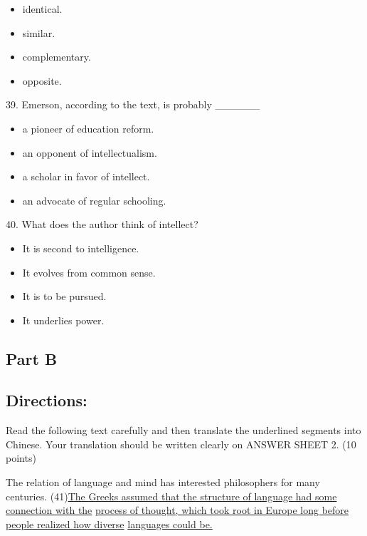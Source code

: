 \documentclass[UTF8,11pt]{ctexart}
\begin{document}
\begin{itemize}[leftmargin=2em,itemsep=.2em,topsep=.4em]\item[A.] identical.
\item[B.] similar.
\item[C.] complementary.
\item[D.] opposite.
\end{itemize}

39. Emerson, according to the text, is probably \_\_\_\_\_\_


\begin{itemize}[leftmargin=2em,itemsep=.2em,topsep=.4em]\item[A.] a pioneer of education reform.
\item[B.] an opponent of intellectualism.
\item[C.] a scholar in favor of intellect.
\item[D.] an advocate of regular schooling.
\end{itemize}

40. What does the author think of intellect?


\begin{itemize}[leftmargin=2em,itemsep=.2em,topsep=.4em]\item[A.] It is second to intelligence.
\item[B.] It evolves from common sense.
\item[C.] It is to be pursued.
\item[D.] It underlies power.
\end{itemize}

\subsection*{\textbf{Part B}}


\subsection*{\textbf{Directions:}}


Read the following text carefully and then translate the underlined segments into Chinese. Your translation should be written clearly on ANSWER SHEET 2. (10 points)


The relation of language and mind has interested philosophers for many centuries. (41)\uline{The Greeks assumed that the structure of language had some connection with the} \uline{process of thought, which took root in Europe long before people realized how diverse} \uline{languages could be.}
\end{document}
